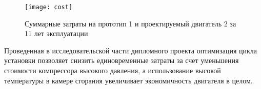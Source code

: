 \begin{figure}[H]
    \centering
    \texttt{[image: cost]}
    \caption{Суммарные затраты на прототип 1 и проектируемый двигатель 2 за 11 лет эксплуатации}
\end{figure}
Проведенная в исследовательской части дипломного проекта оптимизация цикла установки позволяет снизить единовременные
затраты за счет уменьшения стоимости компрессора высокого давления, а использование высокой температуры в камере сгорания
увеличивает экономичность двигателя в целом.